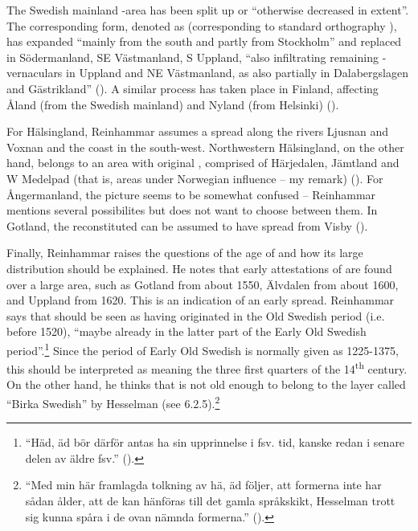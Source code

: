 The Swedish mainland -area has been split up or “otherwise decreased in extent”. The corresponding form, denoted as  (corresponding to standard orthography ), has expanded “mainly from the south and partly from Stockholm” and replaced  in Södermanland, SE Västmanland, S Uppland, “also infiltrating remaining -vernaculars in Uppland and NE Västmanland, as also partially in Dalabergslagen and Gästrikland” (\citet[186]{Reinhammar1975}). A similar process has taken place in Finland, affecting Åland (from the Swedish mainland) and Nyland (from Helsinki) (\citet[187]{Reinhammar1975}).




For Hälsingland, Reinhammar assumes a spread along the rivers Ljusnan and Voxnan and the coast in the south-west. Northwestern Hälsingland, on the other hand, belongs to an area with original , comprised of Härjedalen, Jämtland and W Medelpad (that is, areas under Norwegian influence – my remark) (\citet[186]{Reinhammar1975}). For Ångermanland, the picture seems to be somewhat confused – Reinhammar mentions several possibilites but does not want to choose between them. In Gotland, the reconstituted  can be assumed to have spread from Visby (\citet[188]{Reinhammar1975}). 




Finally, Reinhammar raises the questions of the age of  and how its large distribution should be explained. He notes that early attestations of  are found over a large area, such as Gotland from about 1550, Älvdalen from about 1600, and Uppland from 1620. This is an indication of an early spread. Reinhammar says that  should be seen as having originated in the Old Swedish period (i.e. before 1520), “maybe already in the latter part of the Early Old Swedish period”.\footnote{ “Häd, äd bör därför antas ha sin upprinnelse i fsv. tid, kanske redan i senare delen av äldre fsv.” (\citet[189]{Reinhammar1975}).} Since the period of Early Old Swedish is normally given as 1225-1375, this should be interpreted as meaning the three first quarters of the 14\textsuperscript{th} century. On the other hand, he thinks that is not old enough to belong to the layer called “Birka Swedish” by Hesselman (see 6.2.5).\footnote{ “Med min här framlagda tolkning av hä, äd följer, att formerna inte har sådan ålder, att de kan hänföras till det gamla språkskikt, Hesselman trott sig kunna spåra i de ovan nämnda formerna.” (\citet[190]{Reinhammar1975}).} 




